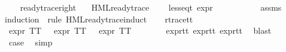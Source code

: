 \begin{isabellebody}
\ \ \isamarkupfalse%
\isanewline
{}\isamarkupfalse%
%
\endisatagproof
{\isafoldproof}%
%
\isadelimproof
\isanewline
%
\endisadelimproof
\isanewline
{}\isamarkupfalse%
\ ready{\isacharunderscore}{\kern0pt}trace{\isacharunderscore}{\kern0pt}right{\isacharcolon}{\kern0pt}\isanewline
\ \ \ {\isachardoublequoteopen}HML{\isacharunderscore}{\kern0pt}ready{\isacharunderscore}{\kern0pt}trace\ {\isasymphi}{\isachardoublequoteclose}\isanewline
\ \ \ {\isachardoublequoteopen}less{\isacharunderscore}{\kern0pt}eq{\isacharunderscore}{\kern0pt}t\ {\isacharparenleft}{\kern0pt}expr\ {\isasymphi}{\isacharparenright}{\kern0pt}\ {\isacharparenleft}{\kern0pt}{\isasyminfinity}{\isacharcomma}{\kern0pt}\ {\isasyminfinity}{\isacharcomma}{\kern0pt}\ {\isasyminfinity}{\isacharcomma}{\kern0pt}\ {}{\isacharcomma}{\kern0pt}\ {}{\isacharcomma}{\kern0pt}\ {}{\isacharparenright}{\kern0pt}{\isachardoublequoteclose}\isanewline
%
\isadelimproof
\ \ %
\endisadelimproof
%
\isatagproof
{}\isamarkupfalse%
\ assms\isanewline
{}\isamarkupfalse%
{\isacharparenleft}{\kern0pt}induction\ {\isasymphi}\ rule{\isacharcolon}{\kern0pt}\ HML{\isacharunderscore}{\kern0pt}ready{\isacharunderscore}{\kern0pt}trace{\isachardot}{\kern0pt}induct{\isacharparenright}{\kern0pt}\isanewline
\ \ \isamarkupfalse%
\ r{\isacharunderscore}{\kern0pt}trace{\isacharunderscore}{\kern0pt}tt\isanewline
\ \ \isamarkupfalse%
\ {\isachardoublequoteopen}expr{\isacharunderscore}{\kern0pt}{}\ TT\ {\isacharequal}{\kern0pt}\ {}{\isachardoublequoteclose}\ {\isachardoublequoteopen}expr{\isacharunderscore}{\kern0pt}{}\ TT\ {\isacharequal}{\kern0pt}\ {}{\isachardoublequoteclose}\ {\isachardoublequoteopen}expr{\isacharunderscore}{\kern0pt}{}\ TT\ {\isacharequal}{\kern0pt}\ {}{\isachardoublequoteclose}\isanewline
\ \ \ \ \isamarkupfalse%
\ expr{\isacharunderscore}{\kern0pt}{}{\isacharunderscore}{\kern0pt}tt\ expr{\isacharunderscore}{\kern0pt}{}{\isacharunderscore}{\kern0pt}tt\ expr{\isacharunderscore}{\kern0pt}{}{\isacharunderscore}{\kern0pt}tt\ \isamarkupfalse%
\ blast{\isacharplus}{\kern0pt}\isanewline
\ \ \isamarkupfalse%
\ \isamarkupfalse%
\ {\isacharquery}{\kern0pt}case\ \isamarkupfalse%
\ simp\isanewline
{}\isamarkupfalse%
\isanewline
\ \ \isamarkupfalse%

\end{isabellebody}
